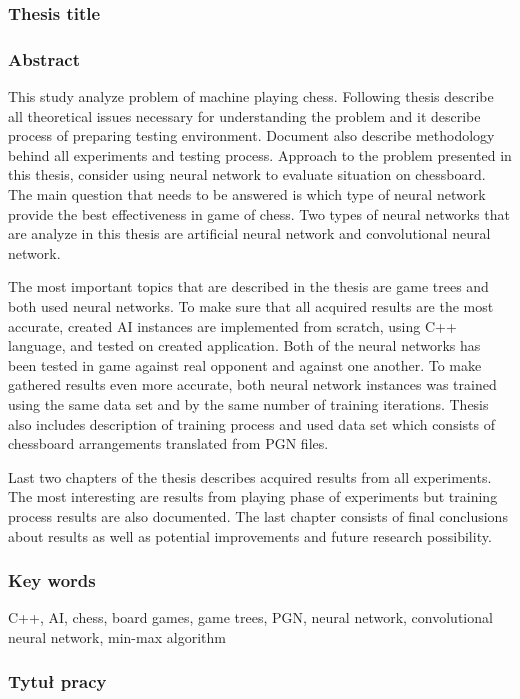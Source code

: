 \subsubsection*{Thesis title}  
\Title

\subsubsection*{Abstract} 
This study analyze problem of machine playing chess. Following thesis describe all theoretical issues necessary for understanding the problem and it describe process of preparing testing environment. Document also describe methodology behind all experiments and testing process. Approach to the problem presented in this thesis, consider using neural network to evaluate situation on chessboard. The main question that needs to be answered is which type of neural network provide the best effectiveness in game of chess. Two types of neural networks that are analyze in this thesis are artificial neural network and convolutional neural network.

The most important topics that are described in the thesis are game trees and both used neural networks. To make sure that all acquired results are the most accurate, created AI instances are implemented from scratch, using C++ language, and tested on created application. Both of the neural networks has been tested in game against real opponent and against one another. To make gathered results even more accurate, both neural network instances was trained using the same data set and by the same number of training iterations. Thesis also includes description of training process and used data set which consists of chessboard arrangements translated from PGN files.

Last two chapters of the thesis describes acquired results from all experiments. The most interesting are results from playing phase of experiments but training process results are also documented. The last chapter consists of final conclusions about results as well as potential improvements and future research possibility.

\subsubsection*{Key words}  
C++, AI, chess, board games, game trees, PGN, neural network, convolutional neural network, min-max algorithm

\subsubsection*{Tytuł pracy}
\begin{otherlanguage}{polish}
\TitleAlt
\end{otherlanguage}

